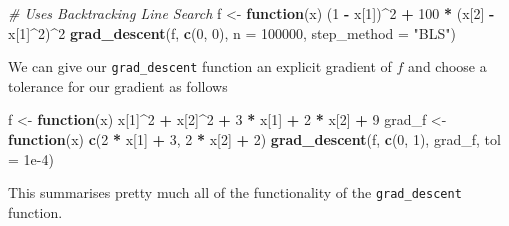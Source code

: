 \documentclass[12pt,]{article}
\newenvironment{Shaded}{\begin{snugshade}}{\end{snugshade}}
\newcommand{\CommentTok}[1]{\textcolor[rgb]{0.56,0.35,0.01}{\textit{#1}}}
\newcommand{\ControlFlowTok}[1]{\textcolor[rgb]{0.13,0.29,0.53}{\textbf{#1}}}
\newcommand{\DataTypeTok}[1]{\textcolor[rgb]{0.13,0.29,0.53}{#1}}
\newcommand{\DecValTok}[1]{\textcolor[rgb]{0.00,0.00,0.81}{#1}}
\newcommand{\FloatTok}[1]{\textcolor[rgb]{0.00,0.00,0.81}{#1}}
\newcommand{\KeywordTok}[1]{\textcolor[rgb]{0.13,0.29,0.53}{\textbf{#1}}}
\newcommand{\NormalTok}[1]{#1}
\newcommand{\OperatorTok}[1]{\textcolor[rgb]{0.81,0.36,0.00}{\textbf{#1}}}
\newcommand{\StringTok}[1]{\textcolor[rgb]{0.31,0.60,0.02}{#1}}
\begin{document}
\begin{Shaded}
\begin{Highlighting}[]
    \CommentTok{# Uses Backtracking Line Search}
\NormalTok{    f <-}\StringTok{ }\ControlFlowTok{function}\NormalTok{(x) (}\DecValTok{1} \OperatorTok{-}\StringTok{ }\NormalTok{x[}\DecValTok{1}\NormalTok{])}\OperatorTok{^}\DecValTok{2} \OperatorTok{+}\StringTok{ }\DecValTok{100} \OperatorTok{*}\StringTok{ }\NormalTok{(x[}\DecValTok{2}\NormalTok{] }\OperatorTok{-}\StringTok{ }\NormalTok{x[}\DecValTok{1}\NormalTok{]}\OperatorTok{^}\DecValTok{2}\NormalTok{)}\OperatorTok{^}\DecValTok{2}
    \KeywordTok{grad_descent}\NormalTok{(f, }\KeywordTok{c}\NormalTok{(}\DecValTok{0}\NormalTok{, }\DecValTok{0}\NormalTok{), }\DataTypeTok{n =} \DecValTok{100000}\NormalTok{, }\DataTypeTok{step_method =} \StringTok{"BLS"}\NormalTok{)}
\end{Highlighting}
\end{Shaded}

We can give our \texttt{grad\_descent} function an explicit gradient of
\(f\) and choose a tolerance for our gradient as follows

\begin{Shaded}
\begin{Highlighting}[]
\NormalTok{    f <-}\StringTok{ }\ControlFlowTok{function}\NormalTok{(x) x[}\DecValTok{1}\NormalTok{]}\OperatorTok{^}\DecValTok{2} \OperatorTok{+}\StringTok{ }\NormalTok{x[}\DecValTok{2}\NormalTok{]}\OperatorTok{^}\DecValTok{2} \OperatorTok{+}\StringTok{ }\DecValTok{3} \OperatorTok{*}\StringTok{ }\NormalTok{x[}\DecValTok{1}\NormalTok{] }\OperatorTok{+}\StringTok{ }\DecValTok{2} \OperatorTok{*}\StringTok{ }\NormalTok{x[}\DecValTok{2}\NormalTok{] }\OperatorTok{+}\StringTok{ }\DecValTok{9}
\NormalTok{    grad_f <-}\StringTok{ }\ControlFlowTok{function}\NormalTok{(x) }\KeywordTok{c}\NormalTok{(}\DecValTok{2} \OperatorTok{*}\StringTok{ }\NormalTok{x[}\DecValTok{1}\NormalTok{] }\OperatorTok{+}\StringTok{ }\DecValTok{3}\NormalTok{, }\DecValTok{2} \OperatorTok{*}\StringTok{ }\NormalTok{x[}\DecValTok{2}\NormalTok{] }\OperatorTok{+}\StringTok{ }\DecValTok{2}\NormalTok{)}
    \KeywordTok{grad_descent}\NormalTok{(f, }\KeywordTok{c}\NormalTok{(}\DecValTok{0}\NormalTok{, }\DecValTok{1}\NormalTok{), grad_f, }\DataTypeTok{tol =} \FloatTok{1e-4}\NormalTok{)}
\end{Highlighting}
\end{Shaded}

This summarises pretty much all of the functionality of the
\texttt{grad\_descent} function. \newpage
\end{document}
